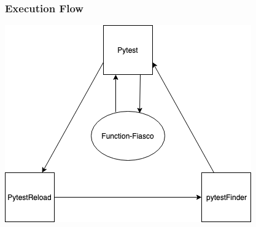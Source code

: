 \begin{frame}
  \frametitle{Execution Flow}
  \begin{center}
    \includegraphics[scale = .5]{images/pytestFlow.png}
  \end{center}
\end{frame}

